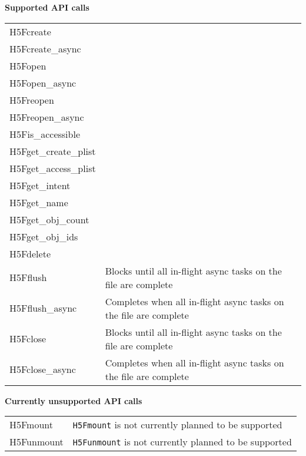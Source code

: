 \documentclass[../users_guide.tex]{subfiles}
\begin{document}
\begin{center}

\textbf{Supported API calls}
\vspace{.2in} \\

\begin{tabularx}{\linewidth}{| X | >{\RaggedRight}X |}
\hline
\rowcolor{lightgray!50}%
\multicolumn{1}{| c |}{\textbf{API call}} & \multicolumn{1}{c |}{\textbf{Notes}} \\ \hline

H5Fcreate & \\ \hline
H5Fcreate\_async & \\ \hline
H5Fopen & \\ \hline
H5Fopen\_async & \\ \hline
H5Freopen & \\ \hline
H5Freopen\_async & \\ \hline
H5Fis\_accessible & \\ \hline
H5Fget\_create\_plist & \\ \hline
H5Fget\_access\_plist & \\ \hline
H5Fget\_intent & \\ \hline
H5Fget\_name & \\ \hline
H5Fget\_obj\_count & \\ \hline
H5Fget\_obj\_ids & \\ \hline
H5Fdelete & \\ \hline
H5Fflush & Blocks until all in-flight async tasks on the file are complete\\ \hline
H5Fflush\_async & Completes when all in-flight async tasks on the file are complete\\ \hline
H5Fclose & Blocks until all in-flight async tasks on the file are complete\\ \hline
H5Fclose\_async & Completes when all in-flight async tasks on the file are complete\\ \hline

\end{tabularx}

\textbf{Currently unsupported API calls}
\vspace{.2in} \\

\begin{tabularx}{\linewidth}{| X | >{\RaggedRight}X |}
\hline
\rowcolor{lightgray!50}%
\multicolumn{1}{| c |}{\textbf{API call}} & \multicolumn{1}{c |}{\textbf{Notes}} \\ \hline

H5Fmount & \texttt{H5Fmount} is not currently planned to be supported\\ \hline
H5Funmount & \texttt{H5Funmount} is not currently planned to be supported\\ \hline

\end{tabularx}

\end{center}
\end{document}
